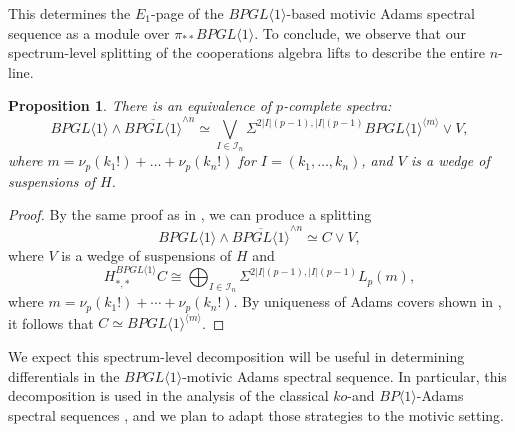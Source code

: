 \documentclass{amsart}
\newtheorem{proposition}[theorem]{Proposition}
\theoremstyle{plain}
\numberwithin{theorem}{section}
\numberwithin{equation}{section}
\numberwithin{figure}{section}
\newcommand{\0}{\langle 0 \rangle }
\begin{document}
This determines the $E_1$-page of the $BPGL\langle 1 \rangle$-based motivic Adams spectral sequence as a module over $\pi_{**}BPGL\langle 1 \rangle$. To conclude, we observe that our spectrum-level splitting of the cooperations algebra lifts to describe the entire $n$-line.

\begin{proposition}
    There is an equivalence of $p$-complete spectra:
    \[BPGL \langle 1 \rangle \wedge \overline{BPGL \langle 1 \rangle}^{\wedge n} \simeq\bigvee_{I \in \mathcal{I}_n}\Sigma^{2|I|(p-1), |I|(p-1)}BPGL \langle 1 \rangle^{\langle m \rangle} \vee V,\]
    where $m = \nu_p(k_1!) + \dots +\nu_p(k_n!)$ for $I = (k_1, \dots, k_n)$, and $V$ is a wedge of suspensions of $H$.
\end{proposition}

\begin{proof}
    By the same proof as in , we can produce a splitting
    \[BPGL \langle 1 \rangle \wedge \overline{BPGL \langle 1 \rangle}^{\wedge n} \simeq C \vee V,\]
    where $V$ is a wedge of suspensions of $H$ and 
    \[H_{*,*}^{BPGL \langle 1 \rangle}C \cong \bigoplus_{I \in \mathcal{I}_n}\Sigma^{2|I|(p-1), |I|(p-1)}L_p(m),\]
    where $m = \nu_p(k_1!) + \cdots +\nu_p(k_n!)$. By uniqueness of Adams covers shown in , it follows that $C \simeq BPGL \langle 1 \rangle^{\langle m \rangle}$.
\end{proof}

We expect this spectrum-level decomposition will be useful in determining differentials in the $BPGL \langle 1 \rangle$-motivic Adams spectral sequence. In particular, this decomposition is used in the analysis of the classical $ko$-and $BP\langle 1 \rangle$-Adams spectral sequences \cite{BBBCX, Gonzalez00}, and we plan to adapt those strategies to the motivic setting.




\printbibliography
\end{document}

